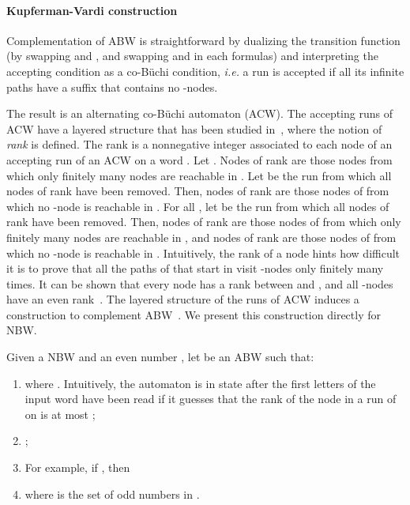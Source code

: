 \documentclass{LMCS}
\begin{document}
\paragraph{{\bf Kupferman-Vardi construction}} 
Complementation of ABW is straightforward by dualizing the transition
function (by swapping  and , and swapping  and
 in each formulas) and interpreting the accepting condition
 as a co-B\"uchi condition, {\it i.e.} a run  is accepted
if all its infinite paths have a suffix that contains no -nodes.


The result is an alternating co-B\"uchi automaton (ACW). The accepting runs of
ACW have a layered structure that has been studied
in~\cite{kupferman97weak}, where the notion of \emph{rank} is
defined.  The rank is a nonnegative integer associated to each node of an accepting
run  of an ACW on a word .  Let . Nodes of rank 
are those nodes from which only finitely many nodes are reachable in
. Let  be the run  from which all nodes of rank 
have been removed. Then, nodes of rank  are those nodes of 
from which no -node is reachable in . For all , let
 be the run  from which all nodes of rank
 have been removed. Then, nodes of rank  are those
nodes of  from which only finitely many nodes are reachable in
, and nodes of rank  are those nodes of  from
which no -node is reachable in . Intuitively, the
rank of a node  hints how difficult it is to prove that all
the paths of  that start in  visit -nodes only
finitely many times. It can be shown that every node has a rank
between  and , and all -nodes
have an even rank~\cite{GurumurthyKSV03}. The layered structure of the 
runs of ACW induces a construction to complement ABW~\cite{kupferman97weak}. 
We present this construction directly for NBW. 

\begin{defi}\label{def:KV-construction}
Given a NBW  and an even number , let  be an ABW such that:

\begin{enumerate}[]
\item  where .
  Intuitively, the automaton  is in state 
  after the first  letters of the input word  have been read if
  it guesses that the rank of the node  in a run of  on
   is at most ;
\item ;
\item  

\medskip
\noindent For example, if , then 

\item  where  is the set of odd numbers in .
\end{enumerate}
\end{defi}
\end{document}
